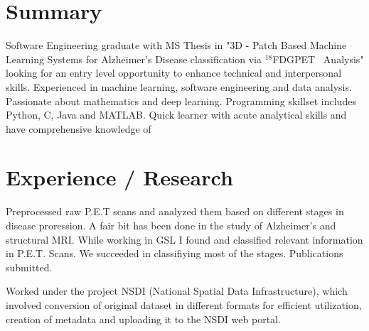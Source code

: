 \documentclass[hidelinks,letterpaper]{deedy-resume-openfont} %
\begin{document}
	\begin{minipage}[t]{0.66\textwidth} %
		
		\section{Summary}
		\footnotesize
		Software Engineering graduate with MS Thesis in "3D - Patch Based Machine Learning Systems for Alzheimer's Disease classification via $^{18}$FDGPET ~Analysis" looking for an entry level opportunity to enhance technical and interpersonal skills. Experienced in machine learning, software engineering and data analysis. Passionate about mathematics and deep learning. Programming skillset includes Python, C, Java and MATLAB. Quick learner with acute analytical skills and have comprehensive knowledge of   
		
		
		\section{Experience / Research}
		
		
		\footnotesize
		Preprocessed raw P.E.T scans and analyzed them based on different stages in disease proression. A fair bit
		has been done in the study of Alzheimer’s and structural MRI. While working in GSL I  found and classified relevant information in P.E.T. Scans. We succeeded in classifiying most of the stages. Publications submitted.
		\sectionsep
		
		
		\footnotesize
		Worked under the project NSDI (National Spatial Data Infrastructure), which involved conversion of
		original dataset in different formats for efficient utilization, creation of metadata and uploading it to the
		NSDI web portal.
		\sectionsep
		

\end{minipage}
\end{document}
